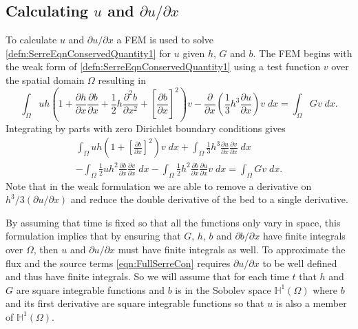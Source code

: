 \documentclass[times]{elsarticle}
\begin{document}
\subsection{Calculating $u$ and $\partial u / \partial x$}
To calculate $u$ and $\partial u / \partial x$ a FEM is used to solve \eqref{defn:SerreEqnConservedQuantity1} for $u$ given $h$, $G$ and $b$. The FEM begins with the weak form of \eqref{defn:SerreEqnConservedQuantity1} using a test function $v$ over the spatial domain $\Omega$ resulting in
\begin{equation*}
 \int_{\Omega } uh \left(1 + \frac{\partial h}{\partial x}\frac{\partial b}{\partial x} + \frac{1}{2}h\frac{\partial^2 b}{\partial x^2} +  \left[\frac{\partial b}{\partial x}\right]^2 \right) v - \frac{\partial}{\partial x}\left(\frac{1}{3}h^3  \frac{\partial {u}}{\partial x}\right) v \; dx = \int_{\Omega } G v \; dx.
\end{equation*}
Integrating by parts with zero Dirichlet boundary conditions gives
\begin{multline}
\int_{\Omega } uh \left(1 + \left[\frac{\partial b}{\partial x}\right]^2 \right) v \; dx +  \int_{\Omega } \frac{1}{3}h^3  \frac{\partial {u}}{\partial x} \frac{\partial v}{\partial x} \; dx  \\ - 
\int_{\Omega }   \frac{1}{2} u h^2\frac{\partial b}{\partial x}  \frac{\partial v }{\partial x}\; dx - 
\int_{\Omega }   \frac{1}{2}h^2\frac{\partial b}{\partial x}  \frac{\partial u }{\partial x}v \; dx = \int_{\Omega } G v \; dx.
\label{eqn:WeakFormDomain}
\end{multline}
Note that in the weak formulation we are able to remove a derivative on $h^3/3\left(\partial u / \partial x\right)$ and reduce the double derivative of the bed to a single derivative.

By assuming that time is fixed so that all the functions only vary in space, this formulation implies that by ensuring that $G$, $h$, $b$ and $\partial b / \partial x$ have finite integrals over $\Omega$, then $u$ and $\partial u / \partial x$ must have finite integrals as well. To approximate the flux and the source terms \eqref{eqn:FullSerreCon} requires $\partial u / \partial x$ to be well defined and thus have finite integrals. So we will assume that for each time $t$ that $h$ and $G$ are square integrable functions and $b$ is in the Sobolev space $\mathbb{H}^{1}(\Omega)$ where $b$ and its first derivative are square integrable functions so that $u$ is also a member of $\mathbb{H}^{1}(\Omega)$.
\end{document}
